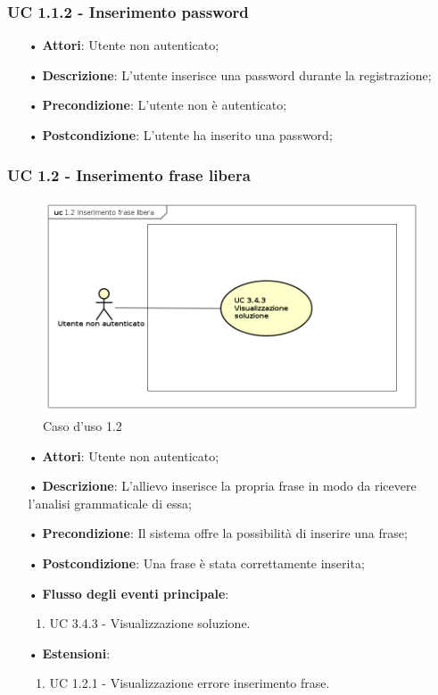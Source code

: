 \subsubsection{UC 1.1.2 - Inserimento password}
\begin{itemize}
\item[•]\textbf{Attori}: Utente non autenticato;
\item[•]\textbf{Descrizione}: L’utente inserisce una password durante la registrazione;
\item[•]\textbf{Precondizione}: L’utente non è autenticato;
\item[•]\textbf{Postcondizione}: L’utente ha inserito una password;
\end{itemize}

\subsubsection{UC 1.2 - Inserimento frase libera}
\begin{figure}[H]
\centering
\includegraphics[width=17cm]{img/UC12.png} 
\caption{Caso d'uso 1.2}\label{fig:12}
\end{figure}
\begin{itemize}
\item[•]\textbf{Attori}: Utente non autenticato;
\item[•]\textbf{Descrizione}: L’allievo inserisce la propria frase in modo da ricevere l’analisi grammaticale di essa;
\item[•]\textbf{Precondizione}: Il sistema offre la possibilità di inserire una frase;
\item[•]\textbf{Postcondizione}: Una frase è stata correttamente inserita;
\item[•]\textbf{Flusso degli eventi principale}:
\begin{enumerate}
\item UC 3.4.3 - Visualizzazione soluzione.
\end{enumerate}
\item[•]\textbf{Estensioni}:
\begin{enumerate}
\item UC 1.2.1 - Visualizzazione errore inserimento frase.
\end{enumerate}
\end{itemize}

